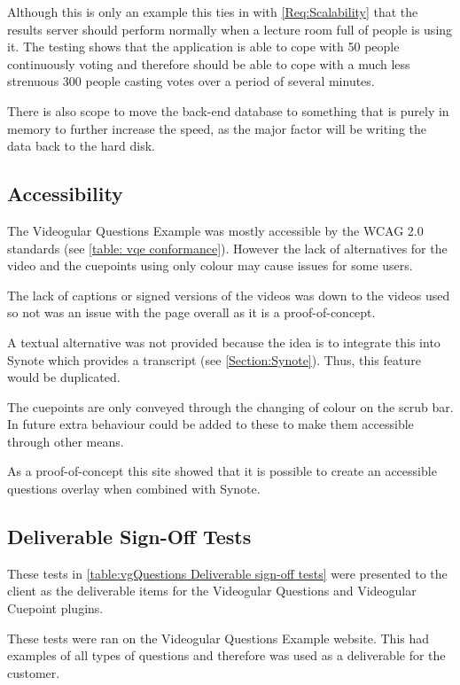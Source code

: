 Although this is only an example this ties in with \cref{Req:Scalability} that the results server should perform normally when a lecture room full of people is using it. The testing shows that the application is able to cope with 50 people continuously voting and therefore should be able to cope with a much less strenuous 300 people casting votes over a period of several minutes.

There is also scope to move the back-end database to something that is purely in memory to further increase the speed, as the major factor will be writing the data back to the hard disk.

\subsection{Accessibility}
\label{Subsection: vqe accessibility}

The \gls{Videogular} Questions Example was mostly accessible by the WCAG 2.0 standards (see \autoref{table: vqe conformance}). However the lack of alternatives for the video and the cuepoints using only colour may cause issues for some users.

The lack of captions or signed versions of the videos was down to the videos used so not was an issue with the page overall as it is a proof-of-concept.

A textual alternative was not provided because the idea is to integrate this into Synote which provides a transcript (see \autoref{Section:Synote}). Thus, this feature would be duplicated.

The cuepoints are only conveyed through the changing of colour on the scrub bar. In future extra behaviour could be added to these to make them accessible through other means.

As a proof-of-concept this site showed that it is possible to create an accessible questions overlay when combined with Synote.

\subsection{Deliverable Sign-Off Tests}

These tests in \autoref{table:vgQuestions Deliverable sign-off tests} were presented to the client as the deliverable items for the Videogular Questions and Videogular Cuepoint plugins.

These tests were ran on the Videogular Questions Example website. This had examples of all types of questions and therefore was used as a deliverable for the customer.

